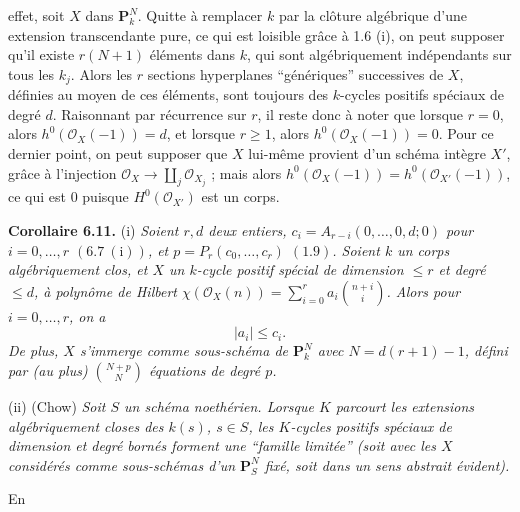effet, soit $X$ dans $\mathbf P^N_k$. Quitte \`a remplacer $k$ par la cl\^oture alg\'ebrique d'une extension transcendante pure, ce qui est loisible gr\^ace \`a 1.6 (i), on peut supposer qu'il existe $r(N+1)$ \'el\'ements dans $k$, qui sont alg\'ebriquement ind\'ependants sur tous les $k_j$. Alors les $r$ sections hyperplanes ``g\'en\'eriques'' successives de $X$, d\'efinies au moyen de ces \'el\'ements, sont toujours des $k$-cycles positifs sp\'eciaux de degr\'e $d$. Raisonnant par r\'ecurrence sur $r$, il reste donc \`a noter que lorsque $r=0$, alors $h^0(\mathcal O_X(-1))=d$, et lorsque $r\ge1$, alors $h^0(\mathcal O_X(-1))=0$. Pour ce dernier point, on peut supposer que $X$ lui-m\^eme provient d'un sch\'ema int\`egre $X'$, gr\^ace \`a l'injection $\mathcal O_X\to \coprod_j\mathcal O_{X_j}$ ; mais alors $h^0(\mathcal O_X(-1))=h^0(\mathcal O_{X'}(-1))$, ce qui est $0$ puisque $H^0(\mathcal O_{X'})$ est un corps.

\textbf{Corollaire 6.11.} (i) \emph{Soient $r,d$ deux entiers, $c_i=A_{r-i}(0,\ldots,0,d;0)$ pour $i=0,\ldots,r$ $(6.7\ \mathrm{(i)})$, et $p=P_r(c_0,\ldots,c_r)$ $(1.9)$. Soient $k$ un corps alg\'ebriquement clos, et $X$ un $k$-cycle positif sp\'ecial de dimension $\le r$ et degr\'e $\le d$, \`a polyn\^ome de Hilbert $\chi(\mathcal O_X(n))=\sum_{i=0}^{r}a_i\binom{n+i}{i}$. Alors pour $i=0,\ldots,r$, on a}
\[
   |a_i|\le c_i.
\]
\emph{De plus, $X$ s'immerge comme sous-sch\'ema de $\mathbf P^N_k$ avec $N=d(r+1)-1$, d\'efini par (au plus) $\binom{N+p}{N}$ \'equations de degr\'e $p$.}

(ii) (Chow) \emph{Soit $S$ un sch\'ema noeth\'erien. Lorsque $K$ parcourt les extensions alg\'ebriquement closes des $k(s)$, $s\in S$, les $K$-cycles positifs sp\'eciaux de dimension et degr\'e born\'es forment une ``famille limit\'ee'' (soit avec les $X$ consid\'er\'es comme sous-sch\'emas d'un $\mathbf P^N_S$ fix\'e, soit dans un sens abstrait \'evident).}

En
